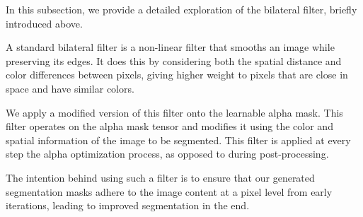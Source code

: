 In this subsection, we provide a detailed exploration of the bilateral filter, briefly introduced above.

A standard bilateral filter is a non-linear filter that smooths an image while preserving its edges. It does this by considering both the spatial distance and color differences between pixels, giving higher weight to pixels that are close in space and have similar colors.

We apply a modified version of this filter onto the learnable alpha mask. This filter operates on the alpha mask tensor and modifies it using the color and spatial information of the image to be segmented. This filter is applied at every step the alpha  optimization process, as opposed to during post-processing.

The intention behind using such a filter is to ensure that our generated segmentation masks adhere to the image content at a pixel level from early iterations, leading to improved segmentation in the end.%


%
%
%
%


